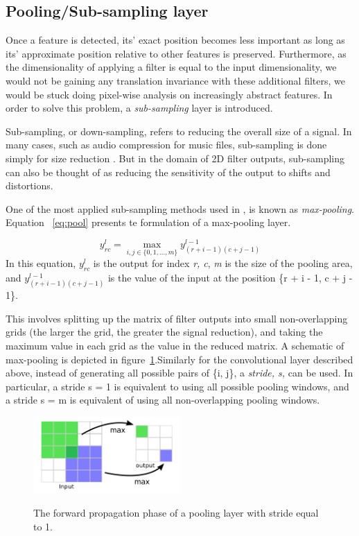 \subsection{Pooling/Sub-sampling layer}
Once a feature is detected, its' exact position becomes less important as long as its' approximate position relative to other features is preserved. Furthermore, as the dimensionality of applying a filter is equal to the input dimensionality, we would not be gaining any translation invariance with these additional filters, we would be stuck doing pixel-wise analysis on increasingly abstract features. In order to solve this problem, a \textit{sub-sampling} layer is introduced.

 Sub-sampling, or down-sampling, refers to reducing the overall size of a signal. In many cases, such as audio compression for music files, sub-sampling is done simply for size reduction \cite{sub}. But in the domain of 2D filter outputs, sub-sampling  can also be thought of as reducing the sensitivity of the output to shifts and distortions.

One of the most applied sub-sampling methods used in \cite{lecun1995comparison}, is known as \textit{max-pooling}. Equation ~\ref{eq:pool} presents te formulation of a max-pooling layer. 

\begin{equation}
y_{rc}^{l} =  \max_{i,j\in\{0,1,...,m\} }  y_{(r+i-1)(c+j-1)}^{l-1}
\label{eq:pool}
\end{equation}
In this equation, $y_{rc}^{l}$ is the output for index \textit{{r, c}}, \textit{m} is the size of the pooling area, and $y_{(r+i-1)(c+j-1)}^{l-1}$ is the value of the input at the position \{r + i - 1, c + j - 1\}.


 
This involves splitting up the matrix of filter outputs into small non-overlapping grids (the larger the grid, the greater the signal reduction), and taking the maximum value in each grid as the value in the reduced matrix. A schematic of max-pooling is depicted in figure~\ref{fig:pooling}.Similarly for the convolutional layer described above, instead of generating all possible pairs of \{i, j\}, a \textit{stride, s,} can be used. In particular, a stride s = 1 is equivalent to using all possible pooling windows, and a stride s = m is equivalent of using all non-overlapping pooling windows.
\begin{figure}[H]
	\centering
	{\includegraphics[width=0.5\textwidth]{images/pooling}}
	\caption{The forward propagation phase of a pooling layer with stride equal to 1.}
	\label{fig:pooling}
\end{figure}
 
